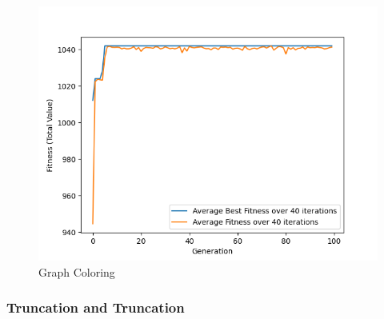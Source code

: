 \documentclass[11pt, letterpaper]{article}
\begin{document}
\begin{figure}[H]
  \includegraphics[width=\linewidth]{images/knapsack_rb_tr.png}
  \caption{Graph Coloring}
\endminipage
\end{figure}

\subsubsection {Truncation and Truncation}
\end{document}
